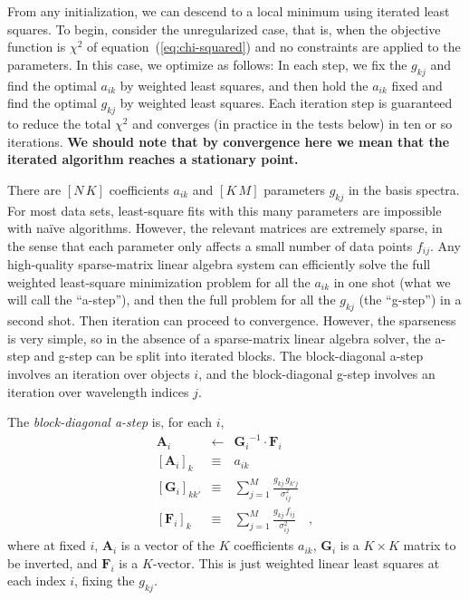 \documentclass[12pt,preprint]{aastex}
\newcommand{\equationname}{equation}
\newcommand{\tv}[1]{\boldsymbol{#1}}
\newcommand{\inverse}[1]{{#1}^{-1}}
\begin{document}
From any initialization, we can descend to a local minimum using
iterated least squares.  To begin, consider the unregularized case,
that is, when the objective function is $\chi^2$ of
\equationname~(\ref{eq:chi-squared}) and no constraints are applied to
the parameters.  In this case, we optimize as follows: In each step,
we fix the $g_{kj}$ and find the optimal $a_{ik}$ by weighted least
squares, and then hold the $a_{ik}$ fixed and find the optimal
$g_{kj}$ by weighted least squares. Each iteration step is guaranteed
to reduce the total $\chi^2$ and converges (in practice in the tests
below) in ten or so iterations. \textbf{We should note that by convergence 
here we mean that the iterated algorithm reaches a stationary point.}

There are $[N\,K]$ coefficients $a_{ik}$ and $[K\,M]$ parameters
$g_{kj}$ in the basis spectra.  For most data sets, least-square fits
with this many parameters are impossible with na\"ive algorithms.
However, the relevant matrices are extremely sparse, in the sense that
each parameter only affects a small number of data points $f_{ij}$.
Any high-quality sparse-matrix linear algebra system can efficiently
solve the full weighted least-square minimization problem for all the
$a_{ik}$ in one shot (what we will call the ``a-step''), and then the
full problem for all the $g_{kj}$ (the ``g-step'') in a second shot.
Then iteration can proceed to convergence.  However, the sparseness is
very simple, so in the absence of a sparse-matrix linear algebra
solver, the a-step and g-step can be split into iterated blocks.  The
block-diagonal a-step involves an iteration over objects $i$, and the
block-diagonal g-step involves an iteration over wavelength indices
$j$.

The \emph{block-diagonal a-step} is, for each $i$,
\begin{eqnarray}\label{eq:astep}\displaystyle
\tv{A}_i & \gets & \inverse{\tv{G}_i}\cdot\tv{F}_i \nonumber\\
\left[\tv{A}_i\right]_k & \equiv & a_{ik} \nonumber\\
\left[\tv{G}_i\right]_{kk'} & \equiv & \sum_{j=1}^{M} \frac{g_{kj}\,g_{k'j}}{\sigma_{ij}^2} \nonumber\\
\left[\tv{F}_i\right]_k     & \equiv & \sum_{j=1}^{M} \frac{g_{kj}\,f_{i j}}{\sigma_{ij}^2}
\quad ,
\end{eqnarray}
where at fixed $i$, $\tv{A}_i$ is a vector of the $K$ coefficients
$a_{ik}$, $\tv{G}_i$ is a $K\times K$ matrix to be inverted, and
$\tv{F}_i$ is a $K$-vector.  This is just weighted linear least
squares at each index $i$, fixing the $g_{kj}$.
\end{document}
